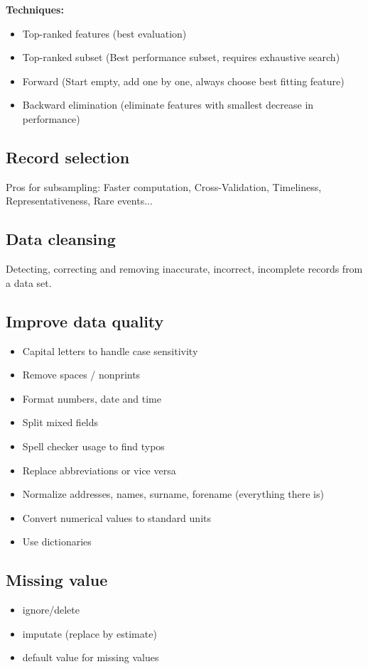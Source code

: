 \documentclass[fleqn, oneside, 10pt, titlepage]{article}
\begin{document}
\textbf{Techniques:}
\begin{itemize}
	\item Top-ranked features (best evaluation)
	\item Top-ranked subset (Best performance subset, requires exhaustive search)
	\item Forward (Start empty, add one by one, always choose best fitting feature)
	\item Backward elimination (eliminate features with smallest decrease in performance)
\end{itemize}

\subsection{Record selection}
Pros for subsampling: Faster computation, Cross-Validation, Timeliness, Representativeness, Rare events...

\subsection{Data cleansing}
Detecting, correcting and removing inaccurate, incorrect, incomplete records from a data set.

\subsection{Improve data quality}
\begin{itemize}
	\item Capital letters to handle case sensitivity
	\item Remove spaces / nonprints
	\item Format numbers, date and time
	\item Split mixed fields
	\item Spell checker usage to find typos
	\item Replace abbreviations or vice versa
	\item Normalize addresses, names, surname, forename (everything there is)
	\item Convert numerical values to standard units
	\item Use dictionaries
\end{itemize}

\subsection{Missing value}
\begin{itemize}
	\item ignore/delete
	\item imputate (replace by estimate)
	\item default value for missing values
\end{itemize}
\end{document}
